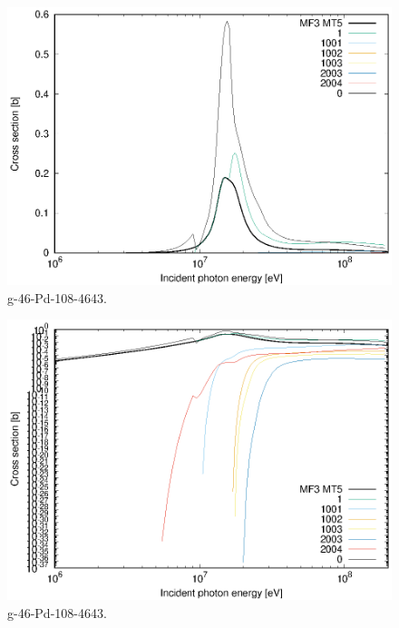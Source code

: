 \begin{figure}
 \includegraphics[width=\linewidth]{eps/g_46-Pd-108_4643.eps}
  \caption{g-46-Pd-108-4643.}
\end{figure}
\begin{figure}
 \includegraphics[width=\linewidth]{eps-log/g_46-Pd-108_4643.eps}
 \caption{g-46-Pd-108-4643.}
\end{figure}
\newpage \clearpage

